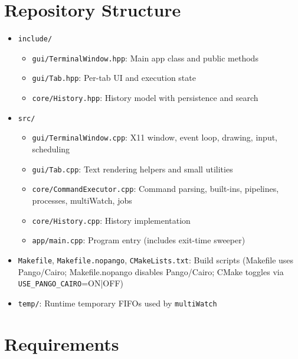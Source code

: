 \documentclass[11pt,a4paper]{article}
\begin{document}
\section{Repository Structure}
\begin{itemize}[leftmargin=*]
  \item \texttt{include/}
    \begin{itemize}
      \item \texttt{gui/TerminalWindow.hpp}: Main app class and public methods
      \item \texttt{gui/Tab.hpp}: Per-tab UI and execution state
      \item \texttt{core/History.hpp}: History model with persistence and search
    \end{itemize}
  \item \texttt{src/}
    \begin{itemize}
      \item \texttt{gui/TerminalWindow.cpp}: X11 window, event loop, drawing, input, scheduling
      \item \texttt{gui/Tab.cpp}: Text rendering helpers and small utilities
      \item \texttt{core/CommandExecutor.cpp}: Command parsing, built-ins, pipelines, processes, multiWatch, jobs
      \item \texttt{core/History.cpp}: History implementation
      \item \texttt{app/main.cpp}: Program entry (includes exit-time sweeper)
    \end{itemize}
  \item \texttt{Makefile}, \texttt{Makefile.nopango}, \texttt{CMakeLists.txt}: Build scripts (Makefile uses Pango/Cairo; Makefile.nopango disables Pango/Cairo; CMake toggles via \texttt{USE\_PANGO\_CAIRO}=ON|OFF)
  \item \texttt{temp/}: Runtime temporary FIFOs used by \texttt{multiWatch}
\end{itemize}

\section{Requirements}
\end{document}
